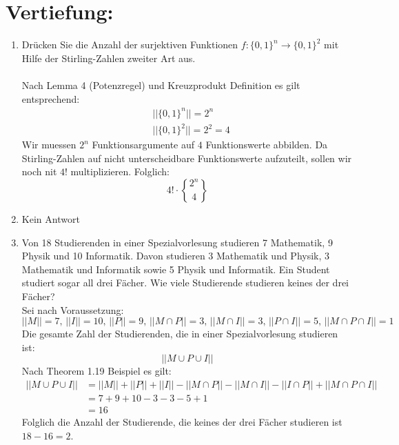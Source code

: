 

\DeclareRobustCommand{\stirling}{\genfrac\{\}{0pt}{}}

    \maketitle
    \section*{Vertiefung:}
    \begin{enumerate}[label=(\alph*)]
        \item Drücken Sie die Anzahl der surjektiven Funktionen 
        $f : \{0, 1\}^n \to \{0, 1\}^2$ mit Hilfe der Stirling-Zahlen zweiter Art aus.\\\\
        Nach Lemma 4 (Potenzregel) und Kreuzprodukt Definition es gilt entsprechend:
        \begin{align*}
	        &||\{0, 1\}^n|| = 2^n \\
	        &|| \{0, 1\}^2|| = 2^2 = 4
	    \end{align*}
	    Wir muessen $2^n$ Funktionsargumente auf $4$ Funktionswerte abbilden. Da Stirling-Zahlen auf 
	    nicht unterscheidbare Funktionswerte aufzuteilt, sollen wir noch nit $4!$ multiplizieren.  
	    Folglich: \[4!\cdot\stirling{2^n}{4}\]

        \item Kein Antwort

        \item Von 18 Studierenden in einer Spezialvorlesung studieren 7 Mathematik, 9 Physik und 10
		Informatik. Davon studieren 3 Mathematik und Physik, 3 Mathematik und Informatik
		sowie 5 Physik und Informatik. Ein Student studiert sogar all drei Fächer. Wie viele
		Studierende studieren keines der drei Fächer?\\
		Sei nach Voraussetzung:
		\[||M|| = 7,\, ||I|| = 10,\, ||P|| = 9,\, ||M \cap P|| = 3,\, ||M \cap I|| = 3,\, 
		  ||P \cap I|| = 5,\, ||M \cap P \cap I|| = 1\]
		Die gesamte Zahl der Studierenden, die in einer Spezialvorlesung studieren ist:
		\[||M \cup P \cup I||\]
		Nach Theorem 1.19 Beispiel es gilt:
		\begin{align*}
	        ||M\cup P\cup I|| &= ||M||+||P||+||I||-||M\cap P||-||M\cap I||-||I \cap P||+||M \cap P \cap I||\\
	        &= 7 + 9 + 10 - 3 - 3 - 5 + 1 \\
	        &= 16
        \end{align*}
        Folglich die Anzahl der Studierende, die keines der drei Fächer studieren ist $18-16 = 2$.


\end{enumerate}
